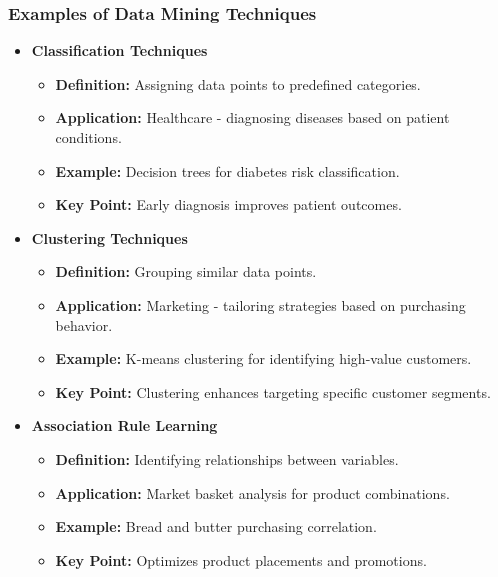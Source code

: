 \documentclass[aspectratio=169]{beamer}
\begin{document}
\begin{frame}[fragile]
    \frametitle{Examples of Data Mining Techniques}
    \begin{itemize}
        \item \textbf{Classification Techniques}
        \begin{itemize}
            \item \textbf{Definition:} Assigning data points to predefined categories.
            \item \textbf{Application:} Healthcare - diagnosing diseases based on patient conditions.
            \item \textbf{Example:} Decision trees for diabetes risk classification.
            \item \textbf{Key Point:} Early diagnosis improves patient outcomes.
        \end{itemize}
        
        \item \textbf{Clustering Techniques}
        \begin{itemize}
            \item \textbf{Definition:} Grouping similar data points.
            \item \textbf{Application:} Marketing - tailoring strategies based on purchasing behavior.
            \item \textbf{Example:} K-means clustering for identifying high-value customers.
            \item \textbf{Key Point:} Clustering enhances targeting specific customer segments.
        \end{itemize}

        \item \textbf{Association Rule Learning}
        \begin{itemize}
            \item \textbf{Definition:} Identifying relationships between variables.
            \item \textbf{Application:} Market basket analysis for product combinations.
            \item \textbf{Example:} Bread and butter purchasing correlation.
            \item \textbf{Key Point:} Optimizes product placements and promotions.
        \end{itemize}
    \end{itemize}
\end{frame}
\end{document}

